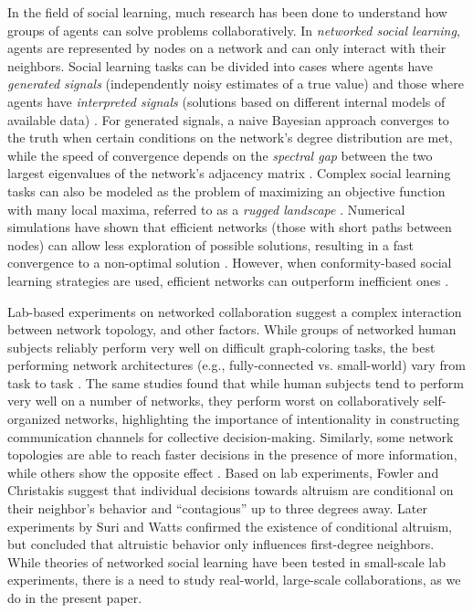 In the field of social learning,
much research has been done to understand how groups of agents
can solve problems collaboratively.
In {\em networked social learning}, agents are represented by nodes on a network
and can only interact with their neighbors.
Social learning tasks can be divided into cases where agents have {\em generated signals}
(independently noisy estimates of a true value)
and those where agents have {\em interpreted signals}
(solutions based on different internal models of available data)
\cite{hong_interpreted_2009}.
For generated signals,
a naive Bayesian approach converges to the truth when certain conditions
on the network's degree distribution are met,
while the speed of convergence depends on the {\em spectral gap}
between the two largest eigenvalues of the network's adjacency matrix
\cite{degroot_reaching_1974, golub_naive_2010}.
Complex social learning tasks can also be modeled as the problem
of maximizing an objective function with many local maxima,
referred to as a {\em rugged landscape}
\cite{lazer_network_2007, mason_propagation_2008, mason_collaborative_2012, grim_scientific_2013, barkoczi_social_2016}.
Numerical simulations have shown that efficient networks (those with short paths between nodes)
can allow less exploration of possible solutions,
resulting in a fast convergence to a non-optimal solution \cite{mason_propagation_2008, grim_scientific_2013}.
However, when conformity-based social learning strategies are used, efficient networks can outperform
inefficient ones \cite{barkoczi_social_2016}.

Lab-based experiments on networked collaboration
suggest a complex interaction between network topology,
and other factors.
While groups of networked human subjects reliably perform very well on
difficult graph-coloring tasks, the best performing network architectures
(e.g., fully-connected vs. small-world) vary
from task to task \cite{kearns_experiments_2012}.
The same studies found that while human subjects tend to perform very well on
a number of networks, they perform worst on collaboratively self-organized
networks, highlighting the importance of intentionality
in constructing communication channels for collective decision-making.
Similarly, some network topologies are able to reach faster decisions in the
presence of more information, while others show the opposite effect
\cite{kearns_experimental_2006}.
Based on lab experiments, Fowler and Christakis \cite{fowler_cooperative_2010}
suggest that individual decisions towards altruism are conditional on their
neighbor's behavior and ``contagious'' up to three degrees away.
Later experiments by Suri and Watts \cite{suri_cooperation_2011} confirmed the
existence of conditional altruism,
but concluded that altruistic
behavior only influences first-degree neighbors.
While theories of networked social learning have been tested in small-scale lab experiments,
there is a need to study real-world, large-scale collaborations,
as we do in the present paper.

